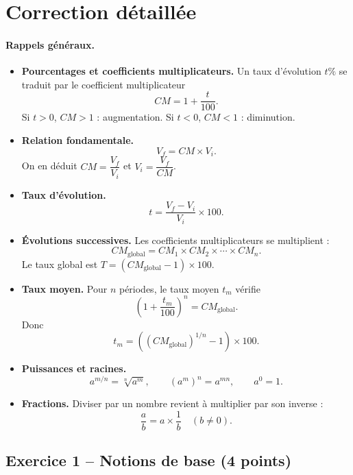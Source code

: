 \documentclass[12pt,a4paper]{article}
\begin{document}

\newpage
\section*{Correction détaillée}

\paragraph{Rappels généraux.}
\begin{itemize}
    \item \textbf{Pourcentages et coefficients multiplicateurs.}  
    Un taux d'évolution \(t\%\) se traduit par le coefficient multiplicateur
    \[
    CM = 1 + \frac{t}{100}.
    \]
    Si \(t>0\), \(CM>1\) : augmentation. Si \(t<0\), \(CM<1\) : diminution.
    \item \textbf{Relation fondamentale.}  
    \[
    V_f = CM \times V_i.
    \]
    On en déduit \(CM = \dfrac{V_f}{V_i}\) et \(V_i = \dfrac{V_f}{CM}\).
    \item \textbf{Taux d'évolution.}  
    \[
    t = \frac{V_f - V_i}{V_i} \times 100.
    \]
    \item \textbf{Évolutions successives.}  
    Les coefficients multiplicateurs se multiplient :
    \[
    CM_{\text{global}} = CM_1 \times CM_2 \times \cdots \times CM_n.
    \]
    Le taux global est \(T = (CM_{\text{global}} - 1) \times 100\).
    \item \textbf{Taux moyen.}  
    Pour \(n\) périodes, le taux moyen \(t_m\) vérifie
    \[
    \left(1 + \frac{t_m}{100}\right)^n = CM_{\text{global}}.
    \]
    Donc
    \[
    t_m = \left( (CM_{\text{global}})^{1/n} - 1 \right) \times 100.
    \]
    \item \textbf{Puissances et racines.}  
    \[
    a^{m/n} = \sqrt[n]{a^m}, \qquad (a^m)^n = a^{mn}, \qquad a^0 = 1.
    \]
    \item \textbf{Fractions.}  
    Diviser par un nombre revient à multiplier par son inverse :
    \[
    \frac{a}{b} = a \times \frac{1}{b} \quad (b \neq 0).
    \]
\end{itemize}

\subsection*{Exercice 1 -- Notions de base (4 points)}
\end{document}
